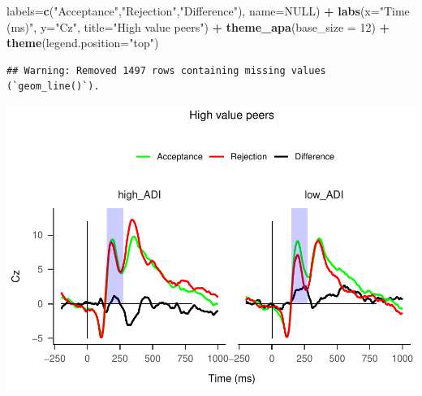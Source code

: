 \documentclass[
]{article}
\newenvironment{Shaded}{\begin{snugshade}}{\end{snugshade}}
\newcommand{\AttributeTok}[1]{\textcolor[rgb]{0.13,0.29,0.53}{#1}}
\newcommand{\ConstantTok}[1]{\textcolor[rgb]{0.56,0.35,0.01}{#1}}
\newcommand{\DecValTok}[1]{\textcolor[rgb]{0.00,0.00,0.81}{#1}}
\newcommand{\FunctionTok}[1]{\textcolor[rgb]{0.13,0.29,0.53}{\textbf{#1}}}
\newcommand{\NormalTok}[1]{#1}
\newcommand{\SpecialCharTok}[1]{\textcolor[rgb]{0.81,0.36,0.00}{\textbf{#1}}}
\newcommand{\StringTok}[1]{\textcolor[rgb]{0.31,0.60,0.02}{#1}}
\begin{document}
\begin{Shaded}
\begin{Highlighting}[]
                     \AttributeTok{labels=}\FunctionTok{c}\NormalTok{(}\StringTok{"Acceptance"}\NormalTok{,}\StringTok{"Rejection"}\NormalTok{,}\StringTok{"Difference"}\NormalTok{), }\AttributeTok{name=}\ConstantTok{NULL}\NormalTok{) }\SpecialCharTok{+}
  \FunctionTok{labs}\NormalTok{(}\AttributeTok{x=}\StringTok{"Time (ms)"}\NormalTok{, }\AttributeTok{y=}\StringTok{"Cz"}\NormalTok{, }\AttributeTok{title=}\StringTok{"High value peers"}\NormalTok{) }\SpecialCharTok{+}
  \FunctionTok{theme\_apa}\NormalTok{(}\AttributeTok{base\_size =} \DecValTok{12}\NormalTok{) }\SpecialCharTok{+} \FunctionTok{theme}\NormalTok{(}\AttributeTok{legend.position=}\StringTok{"top"}\NormalTok{)}
\end{Highlighting}
\end{Shaded}

\begin{verbatim}
## Warning: Removed 1497 rows containing missing values (`geom_line()`).
\end{verbatim}

\includegraphics{do01_BUDS_files/figure-latex/unnamed-chunk-9-1.pdf}
\end{document}
